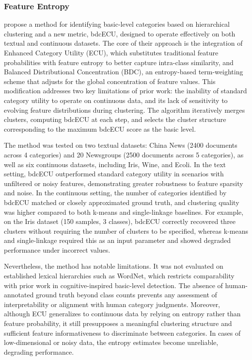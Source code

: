 \documentclass[preprint,12pt,authoryear]{elsarticle}
\begin{document}
\subsubsection{Feature Entropy}

\citet{li_detecting_2019} propose a method for identifying basic-level categories based on hierarchical clustering and a new metric, bdcECU, designed to operate effectively on both textual and continuous datasets. The core of their approach is the integration of Enhanced Category Utility (ECU), which substitutes traditional feature probabilities with feature entropy to better capture intra-class similarity, and Balanced Distributional Concentration (BDC), an entropy-based term-weighting scheme that adjusts for the global concentration of feature values. This modification addresses two key limitations of prior work: the inability of standard category utility to operate on continuous data, and its lack of sensitivity to evolving feature distributions during clustering. The algorithm iteratively merges clusters, computing bdcECU at each step, and selects the cluster structure corresponding to the maximum bdcECU score as the basic level.

The method was tested on two textual datasets: China News (2400 documents across 4 categories) and 20 Newsgroups (2500 documents across 5 categories), as well as six continuous datasets, including Iris, Wine, and Ecoli. In the text setting, bdcECU outperformed standard category utility in scenarios with unfiltered or noisy features, demonstrating greater robustness to feature sparsity and noise. In the continuous setting, the number of categories identified by bdcECU matched or closely approximated ground truth, and clustering quality was higher compared to both k-means and single-linkage baselines. For example, on the Iris dataset (150 samples, 3 classes), bdcECU correctly recovered three clusters without requiring the number of clusters to be specified, whereas k-means and single-linkage required this as an input parameter and showed degraded performance under incorrect values.

Nevertheless, the method has notable limitations. It was not evaluated on established lexical hierarchies such as WordNet, which restricts comparability with prior work in cognitive-inspired basic-level detection. The absence of human-annotated ground truth beyond class counts prevents any assessment of interpretability or alignment with human category judgments. Moreover, although ECU generalizes to continuous data by relying on entropy rather than feature probability, it still presupposes a meaningful clustering structure and sufficient feature informativeness to discriminate between categories. In cases of low-dimensional or noisy data, the entropy estimates become unreliable, degrading performance.
\end{document}
